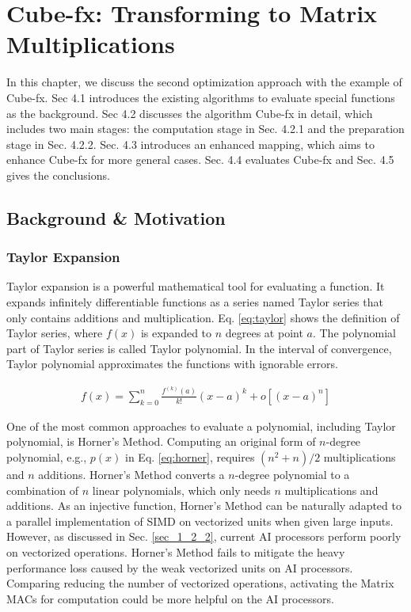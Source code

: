 \chapter{Cube-fx: Transforming to Matrix Multiplications}
\label{sec_4}

In this chapter, we discuss the second optimization approach with the example of Cube-fx. Sec 4.1 introduces the existing algorithms to evaluate special functions as the background. Sec 4.2 discusses the algorithm Cube-fx in detail, which includes two main stages: the computation stage in Sec. 4.2.1 and the preparation stage in Sec. 4.2.2. Sec. 4.3 introduces an enhanced mapping, which aims to enhance Cube-fx for more general cases. Sec. 4.4 evaluates Cube-fx and Sec. 4.5 gives the conclusions.

\section{Background \& Motivation}

\subsection{Taylor Expansion \label{sec:2.3}}

Taylor expansion is a powerful mathematical tool for evaluating a function. It expands infinitely differentiable functions as a series named Taylor series that only contains additions and multiplication. Eq. \ref{eq:taylor} shows the definition of Taylor series, where $f(x)$ is expanded to $n$ degrees at point $a$. The polynomial part of Taylor series is called Taylor polynomial. In the interval of convergence, Taylor polynomial approximates the functions with ignorable errors.

\begin{equation}
    \label{eq:taylor}
    \begin{aligned}
    f(x) = \sum_{k = 0}^{n}\frac{f^{(k)}(a)}{k!}(x - a)^k + o[(x - a) ^ n]
    \end{aligned}
    \end{equation}

One of the most common approaches to evaluate a polynomial, including Taylor polynomial, is Horner's Method. Computing an original form of $n$-degree polynomial, e.g., $p(x)$ in Eq. \ref{eq:horner}, requires $(n^2 + n)/2$ multiplications and $n$ additions. Horner's Method converts a $n$-degree polynomial to a combination of $n$ linear polynomials, which only needs $n$ multiplications and additions. As an injective function, Horner's Method can be naturally adapted to a parallel implementation of SIMD on vectorized units when given large inputs. However, as discussed in Sec. \ref{sec_1_2_2}, current AI processors perform poorly on vectorized operations. Horner's Method fails to mitigate the heavy performance loss caused by the weak vectorized units on AI processors. Comparing reducing the number of vectorized operations, activating the Matrix MACs for computation could be more helpful on the AI processors.

